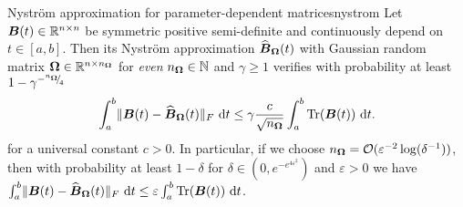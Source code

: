 \documentclass[12pt]{article}
\begin{document}
\begin{lemma}{Nyström approximation for parameter-dependent matrices}{nystrom}
    Let $\boldsymbol{B}(t) \in \mathbb{R}^{n \times n}$ be symmetric positive semi-definite and continuously depend on $t \in [a, b]$. Then its Nyström approximation $\widehat{\boldsymbol{B}}_{\boldsymbol{\Omega}}(t)$ with Gaussian random matrix $\boldsymbol{\Omega} \in \mathbb{R}^{n \times n_{\boldsymbol{\Omega}}}$ for \emph{even} $n_{\boldsymbol{\Omega}} \in \mathbb{N}$ and $\gamma \geq 1$ verifies with probability at least $1 - \gamma^{-{}^{n_{\boldsymbol{\Omega}}}{\mskip -5mu/\mskip -3mu}_{4}}$
    \begin{equation}
        \int_{a}^{b} \lVert \boldsymbol{B}(t) - \widehat{\boldsymbol{B}}_{\boldsymbol{\Omega}}(t) \rVert _F~\mathrm{d}t \leq \gamma \frac{c}{\sqrt{n_{\boldsymbol{\Omega}}}} \int_{a}^{b} \operatorname{Tr}(\boldsymbol{B}(t))~\mathrm{d}t.
    \end{equation}
    for a universal constant $c > 0$. In particular, if we choose $n_{\boldsymbol{\Omega}} = \mathcal{O}(\varepsilon^{-2} \log(\delta^{-1}))$, then with probability at least $1-\delta$ for $\delta \in (0, e^{-e^{4 \varepsilon^2}})$ and $\varepsilon > 0$ we have $\int_{a}^{b} \lVert \boldsymbol{B}(t) - \widehat{\boldsymbol{B}}_{\boldsymbol{\Omega}}(t) \rVert _F~\mathrm{d}t \leq \varepsilon \int_{a}^{b} \operatorname{Tr}(\boldsymbol{B}(t))~\mathrm{d}t$.
\end{lemma}

\end{document}
